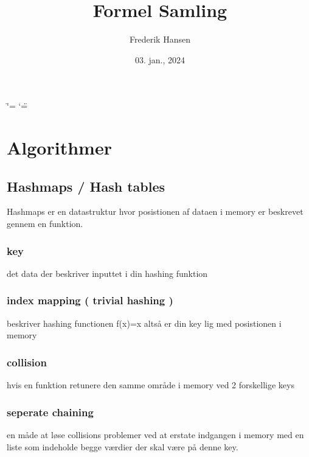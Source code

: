 \documentclass[letterpaper,10pt,danish]{sphinxmanual}
\title{Formel Samling}
\date{03. jan., 2024}
\author{Frederik Hansen}
\begin{document}
\ifdefined\shorthandoff
  \ifnum\catcode`\=\string=\active\shorthandoff{=}\fi
  \ifnum\catcode`\"=\active{}\fi
\fi

\pagestyle{empty}
\sphinxmaketitle
\pagestyle{plain}
\sphinxtableofcontents
\pagestyle{normal}
\label{\detokenize{index::doc}}


\sphinxstepscope


\chapter{Algorithmer}
\label{\detokenize{Algorithmer/index:algorithmer}}\label{\detokenize{Algorithmer/index::doc}}
\sphinxstepscope


\section{Hashmaps / Hash tables}
\label{\detokenize{Algorithmer/Hashmaps:hashmaps-hash-tables}}\label{\detokenize{Algorithmer/Hashmaps::doc}}
\sphinxAtStartPar
Hashmaps er en datastruktur hvor posistionen af dataen i memory er beskrevet gennem en funktion.


\subsection{key}
\label{\detokenize{Algorithmer/Hashmaps:key}}
\sphinxAtStartPar
det data der beskriver inputtet i din hashing funktion


\subsection{index mapping ( trivial hashing )}
\label{\detokenize{Algorithmer/Hashmaps:index-mapping-trivial-hashing}}
\sphinxAtStartPar
beskriver hashing functionen f(x)=x altså er din key lig med posistionen i memory


\subsection{collision}
\label{\detokenize{Algorithmer/Hashmaps:collision}}
\sphinxAtStartPar
hvis en funktion retunere den samme område i memory ved 2 forskellige keys


\subsection{seperate chaining}
\label{\detokenize{Algorithmer/Hashmaps:seperate-chaining}}
\sphinxAtStartPar
en måde at løse collisions problemer ved at erstate indgangen i memory med en liste som indeholde begge værdier der skal være på denne key.
\end{document}
